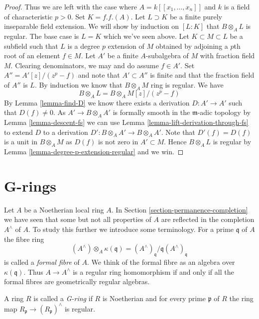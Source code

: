 \begin{proof}
\medskip\noindent
Thus we are left with the case where $A = k[[x_1, \ldots, x_n]]$
and $k$ is a field of characteristic $p > 0$. Set $K = f.f.(A)$.
Let $L \supset K$ be a finite purely inseparable field extension.
We will show by induction on $[L : K]$ that $B \otimes_A L$
is regular. The base case is $L = K$ which we've seen above.
Let $K \subset M \subset L$ be a subfield such that
$L$ is a degree $p$ extension of $M$ obtained by adjoining a $p$th root
of an element $f \in M$. Let $A'$ be a finite $A$-subalgebra
of $M$ with fraction field $M$. Clearing denominators, we may and do assume
$f \in A'$. Set $A'' = A'[z]/(z^p -f)$ and note that $A' \subset A''$
is finite and that the fraction field of $A''$ is $L$.
By induction we know that $B \otimes_A M$ ring is regular.
We have
$$
B \otimes_A L = B \otimes_A M[z]/(z^p - f)
$$
By Lemma \ref{lemma-find-D} we know there exists a derivation
$D : A' \to A'$ such that $D(f) \not = 0$. As $A' \to B \otimes_A A'$
is formally smooth in the $\mathfrak m$-adic topology by
Lemma \ref{lemma-descent-fs}
we can use
Lemma \ref{lemma-lift-derivation-through-fs}
to extend $D$ to a derivation $D' : B \otimes_A A' \to B \otimes_A A'$.
Note that $D'(f) = D(f)$ is a unit in $B \otimes_A M$ as $D(f)$
is not zero in $A' \subset M$. Hence $B \otimes_A L$ is regular by
Lemma \ref{lemma-degree-p-extension-regular} and we win.
\end{proof}





\section{G-rings}
\label{section-G-ring}

\noindent
Let $A$ be a Noetherian local ring $A$. In
Section \ref{section-permanence-completion}
we have seen that some but not all properties of $A$ are reflected in
the completion $A^\wedge$ of $A$. To study this further we introduce
some terminology. For a prime $\mathfrak q$ of $A$ the fibre ring
$$
(A^\wedge) \otimes_A \kappa(\mathfrak q) =
(A^\wedge)_\mathfrak q/\mathfrak q(A^\wedge)_\mathfrak q
$$
is called a {\it formal fibre} of $A$. We think of the formal
fibre as an algebra over $\kappa(\mathfrak q)$. Thus $A \to A^\wedge$
is a regular ring homomorphism if and only if all the formal fibres are
geometrically regular algebras.

\begin{definition}
\label{definition-G-ring}
A ring $R$ is called a {\it G-ring} if $R$ is Noetherian and for every
prime $\mathfrak p$ of $R$ the ring map
$R_\mathfrak p \to (R_\mathfrak p)^\wedge$ is regular.
\end{definition}

